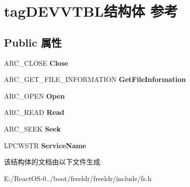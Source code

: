 \hypertarget{structtag_d_e_v_v_t_b_l}{}\section{tag\+D\+E\+V\+V\+T\+B\+L结构体 参考}
\label{structtag_d_e_v_v_t_b_l}
\subsection*{Public 属性}
\begin{DoxyCompactItemize}
\item 
\mbox{\label{structtag_d_e_v_v_t_b_l_abaaf1d1b121583edf73ed5212e11d467}} 
A\+R\+C\+\_\+\+C\+L\+O\+SE {\bfseries Close}
\item 
\mbox{\label{structtag_d_e_v_v_t_b_l_a468bf3d10fb4ae850ac03f6474f0d61f}} 
A\+R\+C\+\_\+\+G\+E\+T\+\_\+\+F\+I\+L\+E\+\_\+\+I\+N\+F\+O\+R\+M\+A\+T\+I\+ON {\bfseries Get\+File\+Information}
\item 
\mbox{\label{structtag_d_e_v_v_t_b_l_a73dd5ec15b0ab52935e4511e1ac3a852}} 
A\+R\+C\+\_\+\+O\+P\+EN {\bfseries Open}
\item 
\mbox{\label{structtag_d_e_v_v_t_b_l_aa3b7cf75788bdaa14c5d53eb96f1c8c6}} 
A\+R\+C\+\_\+\+R\+E\+AD {\bfseries Read}
\item 
\mbox{\label{structtag_d_e_v_v_t_b_l_a2858cbeffe8c17a9a162d8e7e25d06b3}} 
A\+R\+C\+\_\+\+S\+E\+EK {\bfseries Seek}
\item 
\mbox{\label{structtag_d_e_v_v_t_b_l_a2cb8059a8680fa910c37b2d0f2aafc5f}} 
L\+P\+C\+W\+S\+TR {\bfseries Service\+Name}
\end{DoxyCompactItemize}


该结构体的文档由以下文件生成\+:\begin{DoxyCompactItemize}
\item 
E\+:/\+React\+O\+S-\/0../boot/freeldr/freeldr/include/fs.\+h\end{DoxyCompactItemize}
